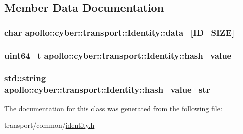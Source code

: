 \subsection{Member Data Documentation}
\hypertarget{classapollo_1_1cyber_1_1transport_1_1Identity_a93e404c11841639d4d76365ef7c543a5}{
\subsubsection[{data\-\_\-}]{\setlength{\rightskip}{0pt plus 5cm}char apollo\-::cyber\-::transport\-::\-Identity\-::data\-\_\-\mbox{[}{\bf I\-D\-\_\-\-S\-I\-Z\-E}\mbox{]}\hspace{0.3cm}{\ttfamily [private]}}}\label{classapollo_1_1cyber_1_1transport_1_1Identity_a93e404c11841639d4d76365ef7c543a5}
\hypertarget{classapollo_1_1cyber_1_1transport_1_1Identity_a92061e946f250dba87a7833337d6d5e8}{
\subsubsection[{hash\-\_\-value\-\_\-}]{\setlength{\rightskip}{0pt plus 5cm}uint64\-\_\-t apollo\-::cyber\-::transport\-::\-Identity\-::hash\-\_\-value\-\_\-\hspace{0.3cm}{\ttfamily [private]}}}\label{classapollo_1_1cyber_1_1transport_1_1Identity_a92061e946f250dba87a7833337d6d5e8}
\hypertarget{classapollo_1_1cyber_1_1transport_1_1Identity_af8049eb6984ba84d1651537a9608421a}{
\subsubsection[{hash\-\_\-value\-\_\-str\-\_\-}]{\setlength{\rightskip}{0pt plus 5cm}std\-::string apollo\-::cyber\-::transport\-::\-Identity\-::hash\-\_\-value\-\_\-str\-\_\-\hspace{0.3cm}{\ttfamily [private]}}}\label{classapollo_1_1cyber_1_1transport_1_1Identity_af8049eb6984ba84d1651537a9608421a}


The documentation for this class was generated from the following file\-:\begin{DoxyCompactItemize}
\item 
transport/common/\hyperlink{identity_8h}{identity.\-h}\end{DoxyCompactItemize}
